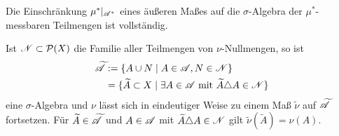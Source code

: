 \begin{example}
Die Einschränkung $\mu^*|_{\AA^*}$ eines äußeren Maßes auf die $\sigma$-Algebra der $\mu^*$-messbaren Teilmengen ist vollständig.
\end{example}

\begin{proposition}
\begin{mdframed}
Ist $\NN \subset \PP(X)$ die Familie aller Teilmengen von $\nu$-Nullmengen, so ist
\begin{equation*}
	\begin{split}
		\widetilde{\AA} & := \{ A \cup N \mid A \in \AA, N \in \NN\}	\\
								& = \{\widetilde{A} \subset X \mid \exists A \in \AA \text{ mit } \widetilde{A} \triangle A \in \NN \}
	\end{split}
\end{equation*}
eine $\sigma$-Algebra und $\nu$ lässt sich in eindeutiger Weise zu einem Maß $\widetilde{\nu}$ auf $\widetilde{\AA}$ fortsetzen. 
Für $\widetilde{A} \in \widetilde{\AA}$ und $A \in \AA$ mit $\widetilde{A} \triangle A \in \NN$ gilt $\widetilde{\nu}(\widetilde{A})=  \nu (A)$.
\end{mdframed}


\end{proposition}
